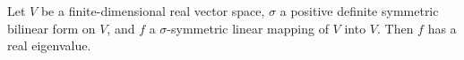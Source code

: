Let $V$ be a finite-dimensional real vector space, $\sigma$ a positive definite symmetric bilinear form on $V$, and $f$ a $\sigma$-symmetric linear mapping of $V$ into $V$. Then $f$ has a real eigenvalue.
